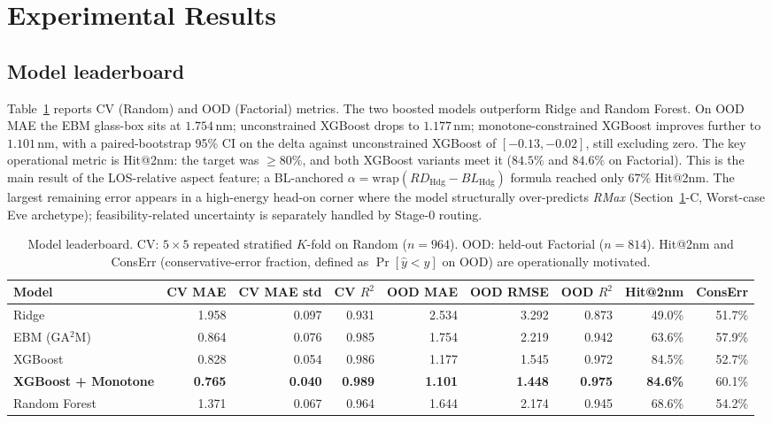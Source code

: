 \documentclass[conference]{IEEEtran}
\begin{document}
\section{Experimental Results}
\label{sec:results}

\subsection{Model leaderboard}
Table~\ref{tab:leaderboard} reports CV (Random) and OOD (Factorial) metrics. The two boosted models outperform Ridge and Random Forest. On OOD MAE the EBM glass-box sits at $1.754$\,nm; unconstrained XGBoost drops to $1.177$\,nm; monotone-constrained XGBoost improves further to $1.101$\,nm, with a paired-bootstrap 95\% CI on the delta against unconstrained XGBoost of $[-0.13, -0.02]$, still excluding zero. The key operational metric is Hit@2nm: the target was $\geq 80\%$, and both XGBoost variants meet it ($84.5\%$ and $84.6\%$ on Factorial). This is the main result of the LOS-relative aspect feature; a BL-anchored $\alpha = \mathrm{wrap}(RD_{\text{Hdg}} - BL_{\text{Hdg}})$ formula reached only $67\%$ Hit@2nm. The largest remaining error appears in a high-energy head-on corner where the model structurally over-predicts \textit{RMax} (Section~\ref{sec:results}-C, Worst-case Eve archetype); feasibility-related uncertainty is separately handled by Stage-0 routing.

\begin{table}[t]
\centering
\caption{Model leaderboard. CV: $5\times 5$ repeated stratified $K$-fold on Random ($n{=}964$). OOD: held-out Factorial ($n{=}814$). Hit@2nm and ConsErr (conservative-error fraction, defined as $\Pr[\hat{y}<y]$ on OOD) are operationally motivated.}
\label{tab:leaderboard}
\begin{tabular}{lrrrrrrrr}
\toprule
Model & CV MAE & CV MAE std & CV $R^2$ & OOD MAE & OOD RMSE & OOD $R^2$ & Hit@2nm & ConsErr \\
\midrule
Ridge                & 1.958 & 0.097 & 0.931 & 2.534 & 3.292 & 0.873 & 49.0\% & 51.7\% \\
EBM (GA$^2$M)        & 0.864 & 0.076 & 0.985 & 1.754 & 2.219 & 0.942 & 63.6\% & 57.9\% \\
XGBoost              & 0.828 & 0.054 & 0.986 & 1.177 & 1.545 & 0.972 & 84.5\% & 52.7\% \\
\textbf{XGBoost + Monotone} & \textbf{0.765} & \textbf{0.040} & \textbf{0.989} & \textbf{1.101} & \textbf{1.448} & \textbf{0.975} & \textbf{84.6\%} & 60.1\% \\
Random Forest        & 1.371 & 0.067 & 0.964 & 1.644 & 2.174 & 0.945 & 68.6\% & 54.2\% \\
\bottomrule
\end{tabular}
\end{table}
\end{document}
